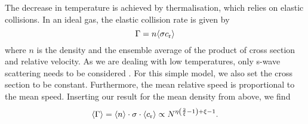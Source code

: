 The decrease in temperature is achieved by thermalisation, which relies on elastic collisions. In an ideal gas, the elastic collision rate \Rcoll is given by \cite[8]{bird1994}
\begin{equation*}
   \Gamma = n \langle\sigma c_\text{r}\rangle
\end{equation*}
where $n$ is the density and \meanProb the ensemble average of the product of cross section and relative velocity. As we are dealing with low temperatures, only s-wave scattering needs to be considered \cite{joachain}. For this simple model, we also set the cross section to be constant. Furthermore, the mean relative speed is proportional to the mean speed. Inserting our result for the mean density from above, we find
\begin{equation*}
    \langle \Gamma\rangle = \langle n\rangle \cdot \sigma \cdot \langle c_\text{r}\rangle \propto N^{\eta \left(\frac{2}{\xi} - 1\right) + \xi - 1}.
\end{equation*}

